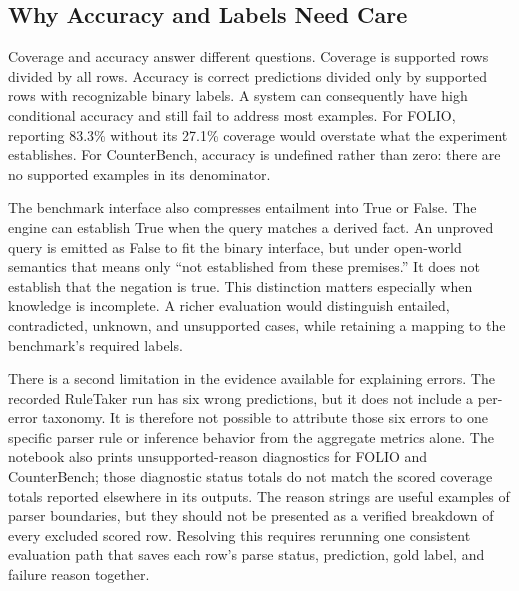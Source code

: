 \documentclass[10pt,twocolumn,letterpaper]{article}
\begin{document}
\subsection{Why Accuracy and Labels Need Care}
Coverage and accuracy answer different questions. Coverage is supported rows divided by all rows. Accuracy is correct predictions divided only by supported rows with recognizable binary labels. A system can consequently have high conditional accuracy and still fail to address most examples. For FOLIO, reporting 83.3\% without its 27.1\% coverage would overstate what the experiment establishes. For CounterBench, accuracy is undefined rather than zero: there are no supported examples in its denominator.

The benchmark interface also compresses entailment into True or False. The engine can establish True when the query matches a derived fact. An unproved query is emitted as False to fit the binary interface, but under open-world semantics that means only ``not established from these premises.'' It does not establish that the negation is true. This distinction matters especially when knowledge is incomplete. A richer evaluation would distinguish entailed, contradicted, unknown, and unsupported cases, while retaining a mapping to the benchmark's required labels.

There is a second limitation in the evidence available for explaining errors. The recorded RuleTaker run has six wrong predictions, but it does not include a per-error taxonomy. It is therefore not possible to attribute those six errors to one specific parser rule or inference behavior from the aggregate metrics alone. The notebook also prints unsupported-reason diagnostics for FOLIO and CounterBench; those diagnostic status totals do not match the scored coverage totals reported elsewhere in its outputs. The reason strings are useful examples of parser boundaries, but they should not be presented as a verified breakdown of every excluded scored row. Resolving this requires rerunning one consistent evaluation path that saves each row's parse status, prediction, gold label, and failure reason together.
\end{document}
